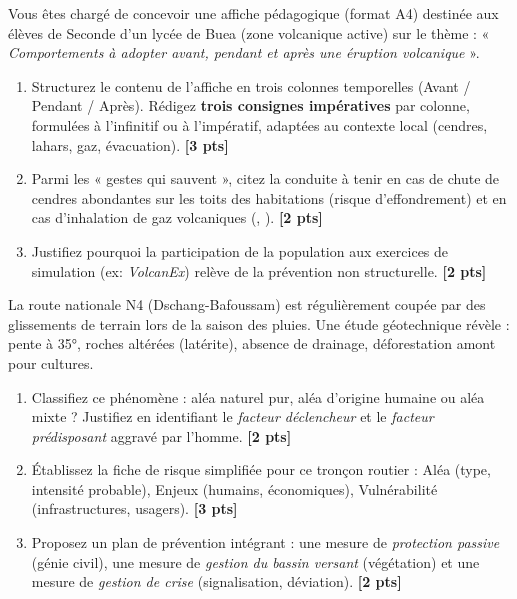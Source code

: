 \documentclass[11pt]{article}
\begin{document}
\begin{exercice}
Vous êtes chargé de concevoir une affiche pédagogique (format A4) destinée aux élèves de Seconde d'un lycée de Buea (zone volcanique active) sur le thème : « \textit{Comportements à adopter avant, pendant et après une éruption volcanique} ».

\begin{enumerate}
    \item Structurez le contenu de l'affiche en trois colonnes temporelles (Avant / Pendant / Après). Rédigez \textbf{trois consignes impératives} par colonne, formulées à l'infinitif ou à l'impératif, adaptées au contexte local (cendres, lahars, gaz, évacuation). \hfill\textbf{[3 pts]}
    \item Parmi les « gestes qui sauvent », citez la conduite à tenir en cas de chute de cendres abondantes sur les toits des habitations (risque d'effondrement) et en cas d'inhalation de gaz volcaniques (, ). \hfill\textbf{[2 pts]}
    \item Justifiez pourquoi la participation de la population aux exercices de simulation (ex: \textit{VolcanEx}) relève de la prévention non structurelle. \hfill\textbf{[2 pts]}
\end{enumerate}
\end{exercice}

\begin{exercice}
La route nationale N4 (Dschang-Bafoussam) est régulièrement coupée par des glissements de terrain lors de la saison des pluies. Une étude géotechnique révèle : pente à 35°, roches altérées (latérite), absence de drainage, déforestation amont pour cultures.

\begin{enumerate}
    \item Classifiez ce phénomène : aléa naturel pur, aléa d'origine humaine ou aléa mixte ? Justifiez en identifiant le \textit{facteur déclencheur} et le \textit{facteur prédisposant} aggravé par l'homme. \textbf{[2 pts]}
    \item Établissez la fiche de risque simplifiée pour ce tronçon routier : Aléa (type, intensité probable), Enjeux (humains, économiques), Vulnérabilité (infrastructures, usagers). \textbf{[3 pts]}
    \item Proposez un plan de prévention intégrant : une mesure de \textit{protection passive} (génie civil), une mesure de \textit{gestion du bassin versant} (végétation) et une mesure de \textit{gestion de crise} (signalisation, déviation). \textbf{[2 pts]}
\end{enumerate}
\end{exercice}
\end{document}

